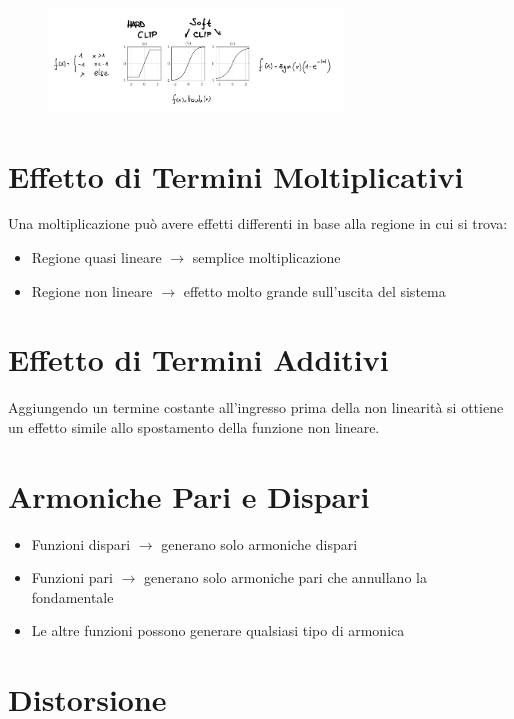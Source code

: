 \begin{figure}[H]
    \centering
    \includegraphics[width=0.7\textwidth]{capitoli/capitolo11/immagini/image1.png}
\end{figure}

\section*{Effetto di Termini Moltiplicativi}

Una moltiplicazione può avere effetti differenti in base alla regione in cui si trova:
\begin{itemize}
    \item Regione quasi lineare $\rightarrow$ semplice moltiplicazione
    \item Regione non lineare $\rightarrow$ effetto molto grande sull’uscita del sistema
\end{itemize}

\section{Effetto di Termini Additivi}

Aggiungendo un termine costante all’ingresso prima della non linearità si ottiene un effetto simile allo spostamento della funzione non lineare.

\section*{Armoniche Pari e Dispari}

\begin{itemize}
    \item Funzioni dispari $\rightarrow$ generano solo armoniche dispari
    \item Funzioni pari $\rightarrow$ generano solo armoniche pari che annullano la fondamentale
    \item Le altre funzioni possono generare qualsiasi tipo di armonica
\end{itemize}

\section{Distorsione}

